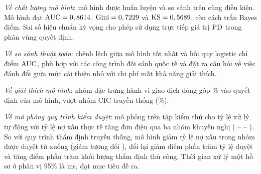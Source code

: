 \textit{Về chất lượng mô hình}: \NModels{} mô hình được huấn luyện và so sánh
trên cùng điều kiện. Mô hình \BestModel{} đạt $\mathrm{AUC} = 0,8614{}$,
$\text{Gini} = 0,7229{}$ và $\mathrm{KS} = 0,5689{}$, còn cách trần Bayes \BayesAUC{}
\GapBayes{} điểm. Sai số hiệu chuẩn kỳ vọng \BestECE{} cho phép sử dụng trực
tiếp giá trị $\mathrm{PD}$ trong phân vùng quyết định.

\textit{Về so sánh thuật toán}: chênh lệch giữa mô hình tốt nhất và hồi quy
logistic chỉ \GapBestLR{} điểm $\mathrm{AUC}$, phù hợp với các công trình đối sánh quốc
tế và đặt ra câu hỏi về việc đánh đổi giữa mức cải thiện nhỏ với chi phí mất khả
năng giải thích.

\textit{Về giải thích mô hình}: nhóm đặc trưng hành vi giao dịch đóng góp
\ShapBehaviourPct{}\% vào quyết định của mô hình, vượt nhóm CIC truyền thống
(\ShapCICPct{}\%).

\textit{Về mô phỏng quy trình kiểm duyệt}: mô phỏng trên tập kiểm thử cho tỷ lệ
xử lý tự động \AutomationRate{} với tỷ lệ nợ xấu thực tế tăng đơn điệu qua ba nhóm khuyến nghị
(\BadApprove{} -- \BadReview{} -- \BadReject{}). So với quy trình thẩm định
truyền thống, mô hình giảm tỷ lệ nợ xấu trong nhóm được duyệt từ \TradBadRate{}
xuống \PropBadRate{} (giảm tương đối \BadRateReductionPct{}), đổi lại giảm
\ApproveRateDrop{} điểm phần trăm tỷ lệ duyệt và tăng \ReviewRateRise{} điểm phần
trăm khối lượng thẩm định thủ công. Thời gian xử lý một hồ sơ ở phân vị 95\% là
\SysPNinetyFive{} ms, đạt mục tiêu đề ra.
